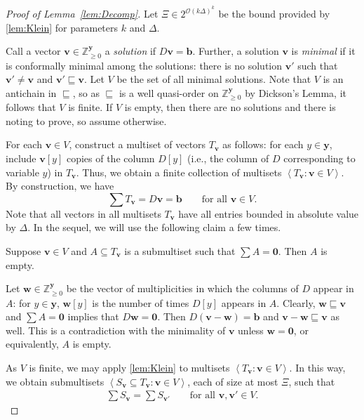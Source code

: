 \documentclass{theoretics}
\renewcommand{\geq}{\geqslant}
\newcommand{\cfleq}{\sqsubseteq}
\newcommand{\Z}{\mathbb{Z}}
\newcommand{\Zn}{\Z_{\geq 0}}
\newcommand{\tup}[1]{{\mathbf{#1}}}
\newcommand{\ww}{\tup w}
\newcommand{\yy}{\tup y}
\newcommand{\bb}{\tup b}
\newcommand{\myvv}{\tup v} %
\newcommand{\mset}[1]{\left\langle #1\right\rangle}
\newcommand{\Oh}{{\mathcal{O}}}
\begin{document}
\begin{proof}[Proof of Lemma~\ref{lem:Decomp}]
Let $\Xi\in 2^{\Oh(k\Delta)^k}$ be the bound provided by \cref{lem:Klein} for parameters $k$ and $\Delta$.

Call a vector $\myvv\in \Zn^\yy$ a {\em{solution}} if $D\myvv=\bb$. Further, a solution $\myvv$ is {\em{minimal}} if it is conformally minimal among the solutions: there is no solution $\myvv'$ such that $\myvv'\neq \myvv$ and $\myvv'\cfleq \myvv$.
Let $V$ be the set of all minimal solutions. Note that $V$ is an antichain in $\cfleq$, so as $\cfleq$ is a well quasi-order on $\Zn^\yy$ by Dickson's Lemma, it follows that $V$ is finite. If $V$ is empty, then there are no solutions and there is noting to prove, so assume otherwise.

For each $\myvv\in V$, construct a multiset of vectors $T_\myvv$ as follows: for each $y\in \yy$, include $\myvv[y]$ copies of the column $D[y]$ (i.e., the column of $D$ corresponding to variable $y$) in $T_\myvv$. Thus, we obtain a finite collection of multisets $\mset{T_\myvv\colon \myvv\in V}$. By construction, we have
$$\sum T_\myvv = D\myvv=\bb\qquad\textrm{for all }\myvv\in V.$$
Note that all vectors in all multisets $T_\myvv$ have all entries bounded in absolute value by $\Delta$. In the sequel, we will use the following claim a few times.

\begin{techclaim}\label{cl:minimal}
    Suppose $\myvv\in V$ and $A\subseteq T_\myvv$ is a submultiset such that $\sum A=\mathbf{0}$. Then $A$ is empty.
\end{techclaim}
\begin{subproof}
    Let $\ww\in \Zn^\yy$ be the vector of multiplicities in which the columns of $D$ appear in $A$: for $y\in \yy$, $\ww[y]$ is the number of times $D[y]$ appears in $A$. Clearly, $\ww\cfleq \myvv$ and $\sum A=\mathbf{0}$ implies that $D\ww=\mathbf{0}$. Then $D(\myvv-\ww)=\bb$ and $\myvv-\ww\cfleq \myvv$ as well. This is a contradiction with the minimality of $\myvv$ unless $\ww=\mathbf{0}$, or equivalently, $A$ is empty.
\end{subproof}


As $V$ is finite, we may apply \cref{lem:Klein} to multisets $\mset{T_\myvv\colon \myvv\in V}$. In this way, we obtain submultisets $\mset{S_\myvv\subseteq T_\myvv\colon \myvv\in V}$, each of size at most $\Xi$,
such that
\begin{align*}
    \sum S_\myvv = \sum S_{\myvv'}\qquad \textrm{for all }\myvv,\myvv'\in V.
\end{align*}


\end{proof}
\end{document}
